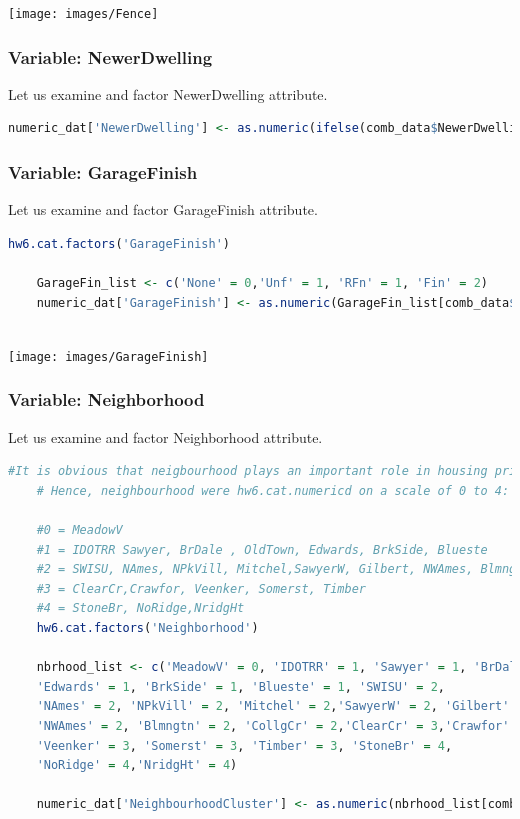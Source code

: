 \documentclass[sigconf]{acmart}
\begin{document}
	\begin{center}
		\texttt{[image: images/Fence]}	
	\end{center}
	
	\subsubsection {Variable: NewerDwelling}
		
	Let us examine and factor NewerDwelling attribute.
	
	\begin{lstlisting}[language=R]
	numeric_dat['NewerDwelling'] <- as.numeric(ifelse(comb_data$NewerDwelling == '20', 1, 0))
	\end{lstlisting}
	
	
	\subsubsection {Variable: GarageFinish}

	
	Let us examine and factor GarageFinish attribute.
	
	\begin{lstlisting}[language=R]
	hw6.cat.factors('GarageFinish')
	
	GarageFin_list <- c('None' = 0,'Unf' = 1, 'RFn' = 1, 'Fin' = 2)
	numeric_dat['GarageFinish'] <- as.numeric(GarageFin_list[comb_data$GarageFinish])
	
	\end{lstlisting}
	
	\begin{center}
		\texttt{[image: images/GarageFinish]}	
	\end{center}
	
	\subsubsection {Variable: Neighborhood}

	
	Let us examine and factor Neighborhood attribute.
	
	\begin{lstlisting}[language=R]
	#It is obvious that neigbourhood plays an important role in housing prices. 
	# Hence, neighbourhood were hw6.cat.numericd on a scale of 0 to 4:
	
	#0 = MeadowV
	#1 = IDOTRR Sawyer, BrDale , OldTown, Edwards, BrkSide, Blueste
	#2 = SWISU, NAmes, NPkVill, Mitchel,SawyerW, Gilbert, NWAmes, Blmngtn, CollgCr
	#3 = ClearCr,Crawfor, Veenker, Somerst, Timber
	#4 = StoneBr, NoRidge,NridgHt
	hw6.cat.factors('Neighborhood')
	
	nbrhood_list <- c('MeadowV' = 0, 'IDOTRR' = 1, 'Sawyer' = 1, 'BrDale' = 1, 'OldTown' = 1, 
	'Edwards' = 1, 'BrkSide' = 1, 'Blueste' = 1, 'SWISU' = 2, 
	'NAmes' = 2, 'NPkVill' = 2, 'Mitchel' = 2,'SawyerW' = 2, 'Gilbert' = 2,
	'NWAmes' = 2, 'Blmngtn' = 2, 'CollgCr' = 2,'ClearCr' = 3,'Crawfor' = 3, 
	'Veenker' = 3, 'Somerst' = 3, 'Timber' = 3, 'StoneBr' = 4, 
	'NoRidge' = 4,'NridgHt' = 4)
	
	numeric_dat['NeighbourhoodCluster'] <- as.numeric(nbrhood_list[comb_data$Neighborhood])
	
	\end{lstlisting}
	
\end{document}

